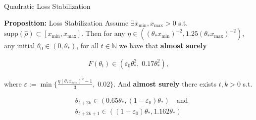 \documentclass[fleqn]{beamer}
\begin{document}
    \begin{frame}{Quadratic Loss Stabilization}
        \begin{block}{\textbf{Proposition:} Loss Stabilization}
            Assume $\exists x_{\text{min}}, x_{\text{max}} > 0$ s.t.
            $\text{supp}(\hat{\rho}) \subset [x_\text{min}, x_\text{max}]$.
            Then for any $\eta \in \left( (\theta_* x_\text{min})^{-2}, 1.25
            (\theta_*x_\text{max})^{-2}\right)$, any initial $\theta_{0} \in
            (0, \theta_*)$, for all $t \in \mathbb{N}$ we have that
            \textbf{almost surely}
            \begin{center}
            \begin{minipage}{0.5\textwidth}
            \begin{align*}
                F(\theta_t) \in \left(\varepsilon_0 \theta_*^{2},\; 0.17
                \theta_*^{2}\right),
            \end{align*}
            \end{minipage}
            \end{center}
        where $\varepsilon := \min
        \{\frac{\eta(\theta_*x_\text{min})^{2}-1}{3},\; 0.02\}$.
        \newline
        And \textbf{almost surely} there exists $t, k >0$ s.t.
        \begin{center}
        \begin{minipage}{0.5\textwidth}
        \begin{align*}
            &\theta_{t+2k} \in (0.65\theta_*, (1-\varepsilon_0)\theta_*) \quad
            \text{and}\\
            &\theta_{t+2k+1} \in ((1-\varepsilon_0)\theta_*, 1.162\theta_*)
        \end{align*}
        \end{minipage}
        \end{center}
        \end{block}
    \end{frame}
\end{document}

